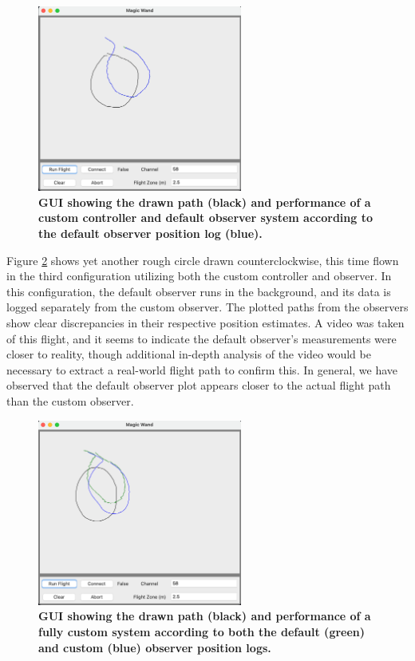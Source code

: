 \documentclass[conf]{new-aiaa}
\begin{document}
        \begin{figure}[H]
        \centering
        \includegraphics[width=0.6\textwidth]{docs/reports/Final Project Update/images/custom_ctrl_default_obsv.png}
        \captionsetup{width=0.6\textwidth}
        \caption{\textbf{GUI showing the drawn path (black) and performance of a custom controller and default observer system according to the default observer position log (blue).}}
        \label{fig:custom_ctrl_default_obsv}
        \end{figure}
        
        Figure \ref{fig:custom_both} shows yet another rough circle drawn counterclockwise, this time flown in the third configuration utilizing both the custom controller and observer. In this configuration, the default observer runs in the background, and its data is logged separately from the custom observer. The plotted paths from the observers show clear discrepancies in their respective position estimates. A video was taken of this flight, and it seems to indicate the default observer's measurements were closer to reality, though additional in-depth analysis of the video would be necessary to extract a real-world flight path to confirm this. In general, we have observed that the default observer plot appears closer to the actual flight path than the custom observer.
        
        \begin{figure}[H]
        \centering
        \includegraphics[width=0.6\textwidth]{docs/reports/Final Project Update/images/custom_both.png}
        \captionsetup{width=0.6\textwidth}
        \caption[width=0.6\textwidth]{\textbf{GUI showing the drawn path (black) and performance of a fully custom system according to both the default (green) and custom (blue) observer position logs.}}
        \label{fig:custom_both}
        \end{figure}
        
\end{document}
